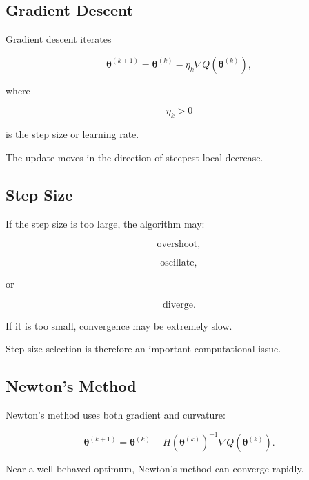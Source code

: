 \subsection{Gradient Descent}
\label{subsec:gradient-descent-statistics}

Gradient descent iterates

\[
\boxed{
\boldsymbol{\theta}^{(k+1)}
=
\boldsymbol{\theta}^{(k)}
-
\eta_k
\nabla
Q
(
\boldsymbol{\theta}^{(k)}
),
}
\]

where

\[
\eta_k>0
\]

is the step size or learning rate.

The update moves in the direction of steepest local decrease.

\subsection{Step Size}
\label{subsec:optimization-step-size}

If the step size is too large, the algorithm may:

\[
\boxed{
\text{overshoot},
}
\]

\[
\boxed{
\text{oscillate},
}
\]

or

\[
\boxed{
\text{diverge}.
}
\]

If it is too small, convergence may be extremely slow.

Step-size selection is therefore an important computational issue.

\subsection{Newton's Method}
\label{subsec:newtons-method-statistics}

Newton's method uses both gradient and curvature:

\[
\boxed{
\boldsymbol{\theta}^{(k+1)}
=
\boldsymbol{\theta}^{(k)}
-
H
(
\boldsymbol{\theta}^{(k)}
)^{-1}
\nabla
Q
(
\boldsymbol{\theta}^{(k)}
).
}
\]

Near a well-behaved optimum, Newton's method can converge rapidly.

